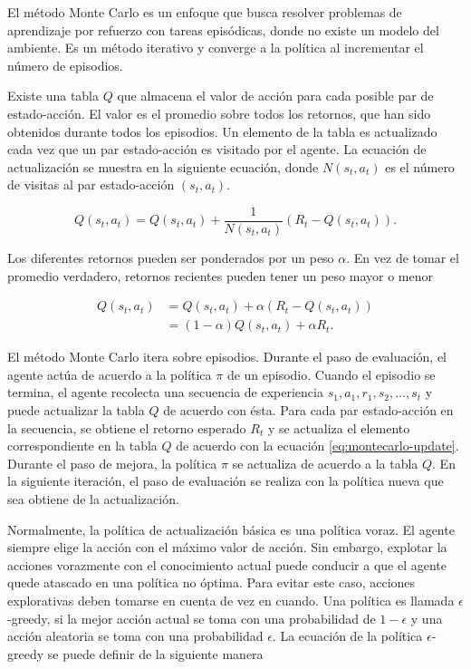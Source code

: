 El método Monte Carlo es un enfoque que busca resolver problemas
de aprendizaje por refuerzo con tareas episódicas, donde 
no existe un modelo del ambiente. 
Es un método iterativo y converge a la política
al incrementar el número de episodios.

Existe una tabla $Q$ que almacena el valor de acción para cada posible
par de estado-acción. El valor es el promedio sobre
todos los retornos, que han sido obtenidos durante todos los episodios. 
Un elemento de la tabla es actualizado cada vez que un par estado-acción
es visitado por el agente. La ecuación de actualización se muestra en la 
siguiente ecuación, donde $N(s_t, a_t)$ es el número de visitas al 
par estado-acción $(s_t, a_t)$.

\[
Q(s_t, a_t) = Q(s_t, a_t) + \frac{1}{N(s_t, a_t)} (R_t - Q(s_t, a_t)).
\]

Los diferentes retornos pueden 
ser ponderados por un peso $\alpha$.
En vez de tomar el promedio
verdadero, retornos recientes pueden tener un peso mayor o menor

\begin{equation}\label{eq:montecarlo-update}
\begin{split}
Q(s_t, a_t) &= Q(s_t, a_t) + \alpha(R_t - Q(s_t, a_t))\\
&= (1-\alpha)Q(s_t, a_t) + \alpha R_t.
\end{split}
\end{equation}

El método Monte Carlo itera sobre episodios. Durante el paso de evaluación, el 
agente actúa de acuerdo a la política $\pi$ de un episodio. Cuando el 
episodio se termina, el agente recolecta una secuencia de experiencia $s_1, a_1, r_1, s_2, \dots, s_t$ y puede actualizar la tabla $Q$ de acuerdo
con ésta.
Para cada par estado-acción en la secuencia, se obtiene el retorno 
esperado $R_t$ y se actualiza el elemento correspondiente en la tabla $Q$ 
de acuerdo con la ecuación \ref{eq:montecarlo-update}.
Durante el paso de mejora,  la
política $\pi$ se actualiza de acuerdo a la tabla $Q$. En la siguiente iteración,
el paso de evaluación se realiza con la política nueva que sea obtiene de la
actualización.

Normalmente, la política de actualización básica es una política voraz. El agente
siempre elige la acción con el máximo valor de acción. Sin embargo, explotar la acciones vorazmente con el conocimiento actual puede conducir a que el
agente quede atascado en una política no óptima. Para evitar 
este caso, acciones explorativas deben tomarse en cuenta de vez en cuando.
Una política es llamada $\epsilon$-greedy, si la mejor acción actual se toma 
con una probabilidad de $1-\epsilon$ y una acción aleatoria se toma con una 
probabilidad $\epsilon$. La ecuación de la política $\epsilon$-greedy
se puede definir de la siguiente manera

